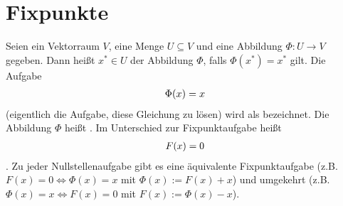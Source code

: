 \section{Fixpunkte}

Seien ein Vektorraum $V$, eine Menge $U \subseteq V$ und eine Abbildung $\Phi: U \to V$ gegeben.
Dann heißt $x^{*} \in U$  der Abbildung $\Phi$, falls $\Phi(x^{*}) = x^{*}$ gilt.
Die Aufgabe
\begin{align}
\Phi(x) = x\notag
\end{align}
(eigentlich die Aufgabe, diese Gleichung zu lösen) wird als  bezeichnet.
Die Abbildung $\Phi$ heißt . Im Unterschied zur Fixpunktaufgabe heißt
\begin{align}
F(x) = 0 \notag
\end{align}
. 
Zu jeder Nullstellenaufgabe gibt es eine äquivalente Fixpunktaufgabe (z.B. $F(x) = 0 \Leftrightarrow \Phi(x) = x $ mit $\Phi(x) := F(x) + x$) und umgekehrt (z.B. $\Phi(x) = x \Leftrightarrow F(x) = 0$ mit $F(x) := \Phi(x) -x$).